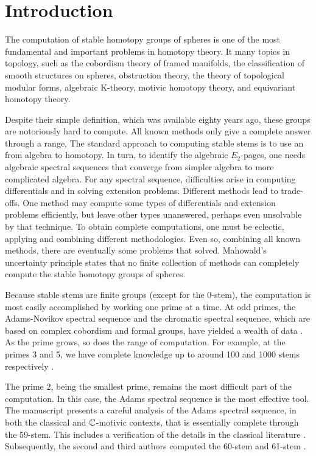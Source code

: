 \chapter{Introduction}

The computation of stable homotopy groups of spheres is one of the most fundamental and important
problems in homotopy theory. It  many topics in topology, such as the cobordism theory of framed manifolds, 
the classification of smooth structures on spheres, obstruction theory, the theory of topological modular forms, algebraic K-theory, motivic homotopy theory, and equivariant homotopy theory.

Despite their simple definition, which was available eighty years ago, these groups are notoriously hard to compute.  All known methods only give a complete answer through a range, 
The standard approach to computing stable stems is to use an 
 from algebra to homotopy.  In turn, to identify the algebraic $E_2$-pages, one needs algebraic spectral sequences that converge from simpler algebra to more complicated algebra. For any spectral sequence, difficulties arise in computing differentials and in solving extension problems. Different methods lead to trade-offs.  One method may compute some types of differentials and extension problems efficiently, but leave other types unanswered, perhaps even unsolvable by that technique. To obtain complete computations, one must be eclectic, applying and combining different methodologies. Even so, combining all known methods, there are eventually some problems that  solved.  Mahowald's uncertainty principle states that no finite collection of methods can completely compute the stable homotopy groups of spheres.

Because stable stems are finite  groups (except for the $0$-stem),
the computation is most easily
accomplished by working one prime at a time.  At odd primes,
the Adams-Novikov spectral sequence and the chromatic spectral sequence, which are based on complex cobordism and formal groups, have yielded a wealth of
data \cite{Ravenel86}. As the prime grows, so does the range of computation. For example, at the primes 3 and 5, we have complete knowledge up to around 100 and 1000 stems respectively \cite{Ravenel86}.

The prime $2$, being the smallest prime, remains the most difficult part of the computation.
In this case, the Adams spectral sequence is the most effective tool.
The manuscript \cite{Isaksen14c} presents a careful analysis of 
the Adams spectral sequence, in both the classical and $\mathbb{C}$-motivic
contexts, that is essentially complete through the 59-stem.
This includes a verification of the details in the classical literature
 \cite{BJM84} \cite{BMT70} \cite{Bruner84} 
  \cite{MT67}.
Subsequently,
the second and third authors computed the 60-stem
and 61-stem \cite{WangXu17}.

